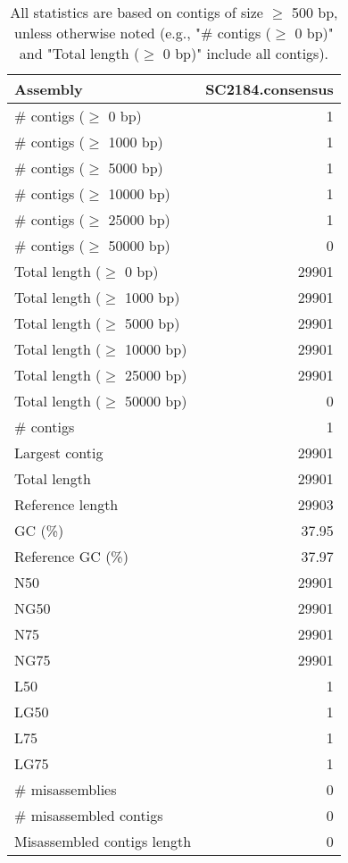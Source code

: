 \documentclass[12pt,a4paper]{article}
\begin{document}
\begin{table}[ht]
\begin{center}
\caption{All statistics are based on contigs of size $\geq$ 500 bp, unless otherwise noted (e.g., "\# contigs ($\geq$ 0 bp)" and "Total length ($\geq$ 0 bp)" include all contigs).}
\begin{tabular}{|l*{1}{|r}|}
\hline
Assembly & SC2184.consensus \\ \hline
\# contigs ($\geq$ 0 bp) & 1 \\ \hline
\# contigs ($\geq$ 1000 bp) & 1 \\ \hline
\# contigs ($\geq$ 5000 bp) & 1 \\ \hline
\# contigs ($\geq$ 10000 bp) & 1 \\ \hline
\# contigs ($\geq$ 25000 bp) & 1 \\ \hline
\# contigs ($\geq$ 50000 bp) & 0 \\ \hline
Total length ($\geq$ 0 bp) & 29901 \\ \hline
Total length ($\geq$ 1000 bp) & 29901 \\ \hline
Total length ($\geq$ 5000 bp) & 29901 \\ \hline
Total length ($\geq$ 10000 bp) & 29901 \\ \hline
Total length ($\geq$ 25000 bp) & 29901 \\ \hline
Total length ($\geq$ 50000 bp) & 0 \\ \hline
\# contigs & 1 \\ \hline
Largest contig & 29901 \\ \hline
Total length & 29901 \\ \hline
Reference length & 29903 \\ \hline
GC (\%) & 37.95 \\ \hline
Reference GC (\%) & 37.97 \\ \hline
N50 & 29901 \\ \hline
NG50 & 29901 \\ \hline
N75 & 29901 \\ \hline
NG75 & 29901 \\ \hline
L50 & 1 \\ \hline
LG50 & 1 \\ \hline
L75 & 1 \\ \hline
LG75 & 1 \\ \hline
\# misassemblies & 0 \\ \hline
\# misassembled contigs & 0 \\ \hline
Misassembled contigs length & 0 \\ \hline

\end{tabular}
\end{center}
\end{table}
\end{document}
